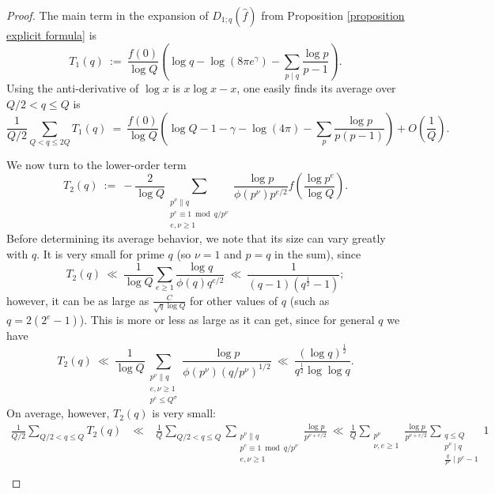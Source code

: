 \documentclass[12pt,reqno]{amsart}
\numberwithin{equation}{section}
\theoremstyle{plain}
\begin{document}
\begin{proof}

The main term in the expansion of $D_{1;q}(\widehat{f})$ from Proposition \ref{proposition explicit formula} is \begin{equation} T_1(q) \ := \ \frac{f(0)}{\log Q} \left(  \log q -\log(8\pi e^{\gamma})-\sum_{p\mid q}\frac{\log p}{p-1}\right).\end{equation}
Using the anti-derivative of $\log x$ is $x \log x - x$, one easily finds its average over $Q/2<q\leq Q$ is
\begin{equation} \frac 1{Q/2} \sum_{Q<q\leq 2Q} T_1(q)\ =\ \frac{f(0)}{\log Q} \left( \log Q -1-\gamma-\log(4\pi) -\sum_p \frac{\log p}{p(p-1)}\right)+O\left( \frac 1{Q} \right).\end{equation}

We now turn to the lower-order term
\begin{equation} T_2(q)\ := \ -\frac 2{\log Q} \sum_{\substack{p^{\nu}\parallel q \\ p^e \equiv 1 \bmod q/p^{\nu} \\ e, \nu \geq 1}}\frac{\log p}{\phi(p^{\nu})p^{e/2}}f\left( \frac{\log p^{e}}{\log Q}\right).\end{equation} Before determining its average behavior, we note that its size can vary greatly with $q$. It is very small for prime $q$ (so $\nu=1$ and $p=q$ in the sum), since
\begin{equation} T_2(q)\  \ll\ \frac 1{\log Q} \sum_{e\geq 1} \frac{\log q}{\phi(q)q^{e/2}}\ \ll\ \frac 1{(q-1)(q^{\frac 12}-1)}; \end{equation}
however, it can be as large as $\frac C{\sqrt q \log Q}$ for other values of $q$ (such as $q=2(2^e-1)$). This is more or less as large as it can get, since for general $q$ we have
\begin{equation} T_2(q) \ \ll\ \frac 1{\log Q} \sum_{\substack{p^{\nu}\parallel q \\ e, \nu \geq 1 \\ p^e \leq Q^{\sigma}}}\frac{\log p}{\phi(p^{\nu})(q/p^{\nu})^{1/2}}\ \ll\ \frac{(\log q)^{\frac 12}}{q^{\frac 12}\log\log q}. \label{bound on T2}\end{equation}
On average, however, $T_2(q)$ is very small:
\begin{eqnarray} \frac 1{Q/2} \sum_{Q/2<q\leq Q} T_2(q) & \ \ll\ & \frac 1Q\sum_{Q/2<q\leq Q} \sum_{\substack{p^{\nu}\parallel q \\ p^e \equiv 1 \bmod q/p^{\nu} \\ e, \nu \geq 1}}\frac{\log p}{p^{\nu+e/2}}\ \ll\  \frac 1Q \sum_{\substack{p^{\nu} \\ \nu, e \geq 1}} \frac{\log p}{p^{\nu+e/2}} \sum_{\substack{q\leq Q \\ p^{\nu}\mid q \\ \frac{q}{p^{\nu}}\mid p^e-1}} 1 \nonumber\\

\end{eqnarray}
\end{proof}
\end{document}
